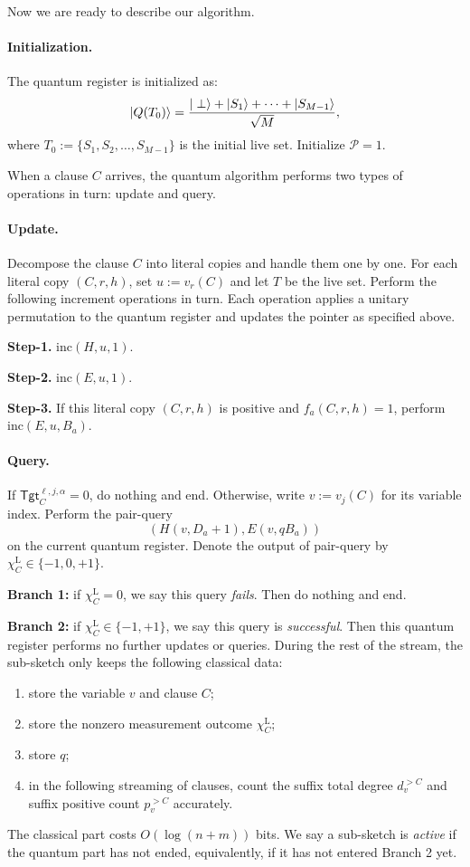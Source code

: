 \medskip

Now we are ready to describe our algorithm.
\paragraph{Initialization.} The quantum register is initialized as: 
\[
  \left|Q(T_0)\right\rangle
  =
  \frac{|\perp\rangle+|S_1\rangle+\cdots+|S_{M-1}\rangle}{\sqrt M},
\]
where $T_0:=\{S_1,S_2,\dots,S_{M-1}\}$ is the initial live set.
Initialize $\mathcal{P}=1$.

When a clause $C$ arrives, the quantum algorithm performs two types of operations in turn: update and query.

\paragraph{Update.} Decompose the clause $C$ into literal copies and handle them one by one. For each literal copy $(C,r,h)$, set $u:=v_r(C)$ and let $T$ be the live set. Perform the following increment operations in turn. Each operation applies a unitary permutation to the quantum register and updates the pointer as specified above.

\medskip
\textbf{Step-1.} $
      \mathrm{inc}(H,u,1).
    $

\medskip    
\textbf{Step-2.}      $
      \mathrm{inc}(E,u,1).
    $
    
\medskip    
\textbf{Step-3.} If this literal copy $(C,r,h)$ is positive and $f_a(C,r,h)=1$,  perform   $
      \mathrm{inc}(E,u,B_a).
    $ 

\paragraph{Query.} If $\mathsf{Tgt}^{\ell,j,\alpha}_{C}=0$, do nothing and end. Otherwise, write $v:=v_j(C)$ for its variable index. Perform the pair-query $$(H(v,D_{a}+1),  E(v,qB_a ))$$ on the current quantum register. Denote the output of pair-query by $\chi_{C}^{\mathrm L}\in \{-1,0,+1\}$.    

\medskip
\textbf{Branch 1:} if $\chi_{C}^{\mathrm L} = 0$, we say this query \textit{fails}. Then do nothing and end.

\medskip
\textbf{Branch 2:} if  $\chi_{C}^{\mathrm L}\in \{-1,+1\}$, we say this query is \textit{successful}. Then this quantum register performs no further updates or queries. During the rest of the stream, the sub-sketch only keeps the following classical data: \begin{enumerate}
    \item store the variable $v$ and clause $C$;
    \item store the nonzero measurement outcome $\chi_C^{\mathrm L}$;
    \item store $q$;
    \item in the following streaming of clauses, count the suffix total degree  $d_{v}^{>C}$ and suffix positive count $p_{v}^{>C}$ accurately.
\end{enumerate}
The classical part costs $O(\log (n+m))$ bits. We say a sub-sketch is \textit{active} if the quantum part has not ended, equivalently, if it has not entered Branch 2 yet.

